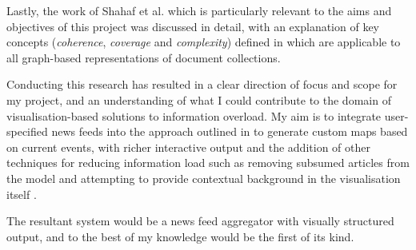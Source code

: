 Lastly, the work of Shahaf et al. \citep{ConnectingTheDots, GeneratingInformationMaps, MetroMapsOfScience, InformationCartographyPre} which is particularly relevant to the aims and objectives of this project was discussed in detail, with an explanation of key concepts (\textit{coherence}, \textit{coverage} and \textit{complexity}) defined in \citep{GeneratingInformationMaps} which are applicable to all graph-based representations of document collections.

Conducting this research has resulted in a clear direction of focus and scope for my project, and an understanding of what I could contribute to the domain of visualisation-based solutions to information overload. My aim is to integrate user-specified news feeds into the approach outlined in \citep{GeneratingInformationMaps} to generate custom maps based on current events, with richer interactive output and the addition of other techniques for reducing information load such as removing subsumed articles from the model \citep{UtilizingPhraseSimilarityMeasures} and attempting to provide contextual background in the visualisation itself \citep{ExploringLongRunningNewsStoriesUsingWikipedia}.

The resultant system would be a news feed aggregator with visually structured output, and to the best of my knowledge would be the first of its kind.  
